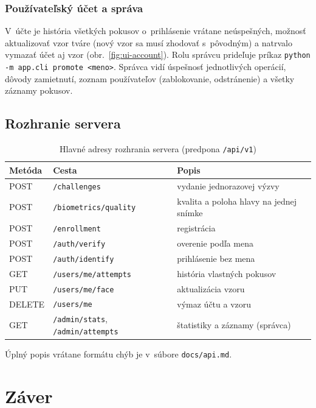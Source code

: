 \documentclass[12pt,a4paper,oneside]{report}
\begin{document}
\subsection*{Používateľský účet a správa}
V~účte je história všetkých pokusov o~prihlásenie vrátane neúspešných, možnosť
aktualizovať vzor tváre (nový vzor sa musí zhodovať s~pôvodným) a natrvalo vymazať
účet aj vzor (obr.~\ref{fig:ui-account}). Rolu správcu prideľuje príkaz
\texttt{python -m app.cli promote <meno>}. Správca vidí úspešnosť jednotlivých operácií,
dôvody zamietnutí, zoznam používateľov (zablokovanie, odstránenie) a všetky záznamy
pokusov.

\section{Rozhranie servera}

\begin{table}[H]
  \centering
  \caption{Hlavné adresy rozhrania servera (predpona \texttt{/api/v1})}
  \label{tab:api}
  \small
  \begin{tabularx}{\textwidth}{@{}l l X@{}}
    \toprule
    Metóda & Cesta & Popis \\
    \midrule
    POST & \texttt{/challenges} & vydanie jednorazovej výzvy \\
    POST & \texttt{/biometrics/quality} & kvalita a poloha hlavy na jednej snímke \\
    POST & \texttt{/enrollment} & registrácia \\
    POST & \texttt{/auth/verify} & overenie podľa mena \\
    POST & \texttt{/auth/identify} & prihlásenie bez mena \\
    GET & \texttt{/users/me/attempts} & história vlastných pokusov \\
    PUT & \texttt{/users/me/face} & aktualizácia vzoru \\
    DELETE & \texttt{/users/me} & výmaz účtu a vzoru \\
    GET & \texttt{/admin/stats}, \texttt{/admin/attempts} & štatistiky a záznamy (správca) \\
    \bottomrule
  \end{tabularx}
\end{table}

Úplný popis vrátane formátu chýb je v~súbore \texttt{docs/api.md}.

\chapter{Záver}
\end{document}
